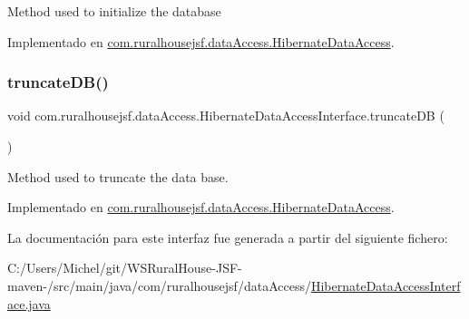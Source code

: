 Method used to initialize the database 

Implementado en \mbox{\hyperlink{classcom_1_1ruralhousejsf_1_1data_access_1_1_hibernate_data_access_af6f8016d5e185e86519871913781fe73}{com.\+ruralhousejsf.\+data\+Access.\+Hibernate\+Data\+Access}}.

\mbox{\label{interfacecom_1_1ruralhousejsf_1_1data_access_1_1_hibernate_data_access_interface_a181eb91e600e57fe36301128022f535d}} 
\subsubsection{\texorpdfstring{truncateDB()}{truncateDB()}}
{\footnotesize\ttfamily void com.\+ruralhousejsf.\+data\+Access.\+Hibernate\+Data\+Access\+Interface.\+truncate\+DB (\begin{DoxyParamCaption}{ }\end{DoxyParamCaption})}

Method used to truncate the data base. 

Implementado en \mbox{\hyperlink{classcom_1_1ruralhousejsf_1_1data_access_1_1_hibernate_data_access_a81a5e60db58acfc1a3c1de2f014813d5}{com.\+ruralhousejsf.\+data\+Access.\+Hibernate\+Data\+Access}}.



La documentación para este interfaz fue generada a partir del siguiente fichero\+:\begin{DoxyCompactItemize}
\item 
C\+:/\+Users/\+Michel/git/\+W\+S\+Rural\+House-\/\+J\+S\+F-\/maven-\//src/main/java/com/ruralhousejsf/data\+Access/\mbox{\hyperlink{_hibernate_data_access_interface_8java}{Hibernate\+Data\+Access\+Interface.\+java}}\end{DoxyCompactItemize}
